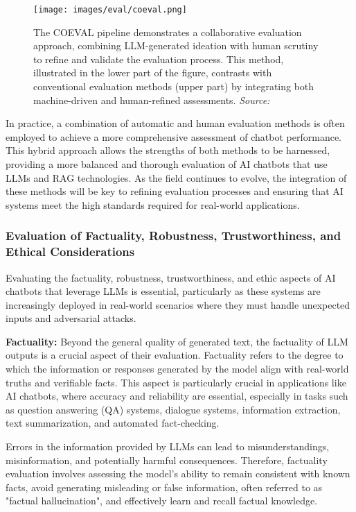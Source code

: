 \begin{figure}[h!]
    \centering
    \texttt{[image: images/eval/coeval.png]}
    \caption{The COEVAL pipeline demonstrates a collaborative evaluation approach, combining LLM-generated ideation with human scrutiny to refine and validate the evaluation process. This method, illustrated in the lower part of the figure, contrasts with conventional evaluation methods (upper part) by integrating both machine-driven and human-refined assessments. \textit{Source:} \cite{li2023collaborative}}
    \label{fig:coeval_pipeline}
\end{figure}

In practice, a combination of automatic and human evaluation methods is often employed to achieve a more comprehensive assessment of chatbot performance. This hybrid approach allows the strengths of both methods to be harnessed, providing a more balanced and thorough evaluation of AI chatbots that use LLMs and RAG technologies. As the field continues to evolve, the integration of these methods will be key to refining evaluation processes and ensuring that AI systems meet the high standards required for real-world applications.

\subsubsection{Evaluation of Factuality, Robustness, Trustworthiness, and Ethical Considerations}

Evaluating the factuality, robustness, trustworthiness, and ethic aspects of AI chatbots that leverage LLMs is essential, particularly as these systems are increasingly deployed in real-world scenarios where they must handle unexpected inputs and adversarial attacks.

\textbf{Factuality:} Beyond the general quality of generated text, the factuality of LLM outputs is a crucial aspect of their evaluation. Factuality refers to the degree to which the information or responses generated by the model align with real-world truths and verifiable facts. This aspect is particularly crucial in applications like AI chatbots, where accuracy and reliability are essential, especially in tasks such as question answering (QA) systems, dialogue systems, information extraction, text summarization, and automated fact-checking.

Errors in the information provided by LLMs can lead to misunderstandings, misinformation, and potentially harmful consequences. Therefore, factuality evaluation involves assessing the model’s ability to remain consistent with known facts, avoid generating misleading or false information, often referred to as "factual hallucination", and effectively learn and recall factual knowledge.

